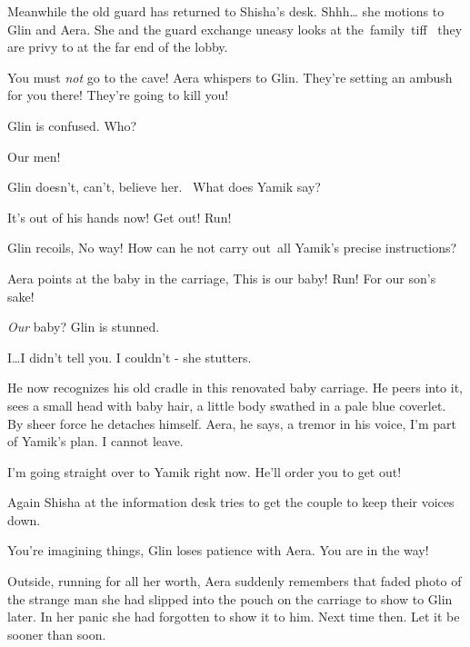 \documentclass[letterpaper]{article}
\begin{document}
Meanwhile the old guard has returned to Shisha's desk. {\textquotedbl}Shhh{\dots}{\textquotedbl} she motions to Glin and
Aera. She and the guard exchange \textcolor[rgb]{0.0,0.4392157,0.7529412}{uneasy looks }at the~family~tiff \ they are
privy to at the far end of the lobby.\textbf{ }

{\textquotedbl}You\textit{ }must\textit{ not} go to the cave!{\textquotedbl} Aera whispers to Glin.
{\textquotedbl}They're setting an ambush for you there! They're going to kill you!{\textquotedbl} 

Glin is confused. {\textquotedbl}Who?{\textquotedbl} \ ~

{\textquotedbl}Our men!{\textquotedbl} 

Glin doesn't, can't, believe her. \ {\textquotedbl}What does Yamik say?{\textquotedbl} 

{\textquotedbl}It's out of his hands now! Get out! Run! {\textquotedbl} 

Glin recoils, {\textquotedbl}No way!{\textquotedbl} How can he not carry out~all Yamik's precise instructions? 

Aera points at the baby in the carriage, {\textquotedbl}This is our baby! Run! For our son's sake!{\textquotedbl}~ 

{\textquotedbl}\textit{Our }baby?{\textquotedbl} Glin is stunned.

{\textquotedbl}I{\dots}I didn't tell you. I couldn't - {\textquotedbl}she stutters.

He now recognizes his old cradle in this renovated baby carriage. He peers into it,\textcolor{red}{ }sees a small head
with baby hair, a little\textcolor[rgb]{0.0,0.4392157,0.7529412}{ }body swathed in a pale blue coverlet. By sheer force
he detaches himself. {\textquotedbl}Aera,{\textquotedbl} he says, a tremor in his voice, {\textquotedbl}I'm part of
Yamik's plan. I cannot leave.{\textquotedbl} 

{\textquotedbl}I'm going straight over to Yamik right now. He'll order you to get out!{\textquotedbl} 

Again Shisha at the information desk tries to get the couple to keep their voices down.

{\textquotedbl}You're imagining things,{\textquotedbl} Glin loses patience with Aera. {\textquotedbl}You are in the
way!{\textquotedbl}

Outside, running for all her worth, Aera suddenly remembers that faded photo of the strange man she had slipped into the
pouch on the carriage to show to Glin later. In her panic she had forgotten to show it to him. Next time then. Let it
be sooner than soon.
\end{document}
